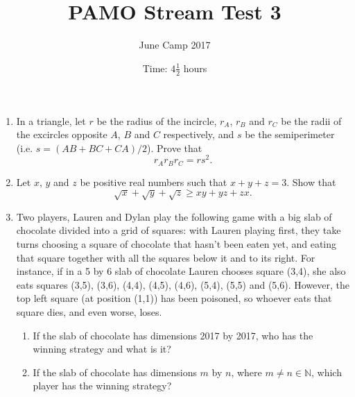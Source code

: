 \documentclass{article}
\title{PAMO Stream Test 3}
\author{June Camp 2017}
\date{Time: $4\frac{1}{2}$ hours}
\begin{document}
 \maketitle

\begin{enumerate}

\item %
	In a triangle, let $r$ be the radius of the incircle, $r_A$, $r_B$ and $r_C$ be the radii of the excircles opposite $A$, $B$ and $C$ respectively, and $s$ be the semiperimeter (i.e. $s = (AB+BC+CA)/2$). Prove that \[r_A r_B r_C = rs^2.\]

\item %
	Let $x$, $y$ and $z$ be positive real numbers such that $x+y+z = 3$. Show that \[\sqrt{x}+\sqrt{y}+\sqrt{z} \geq xy +yz +zx.\]

\item %
	Two players, Lauren and Dylan play the following game with a big slab of chocolate divided into a grid of squares: with Lauren playing first, they take turns choosing a square of chocolate that hasn't been eaten yet, and eating that square together with all the squares below it and to its right. For instance, if in a 5 by 6 slab of chocolate Lauren chooses square (3,4), she also eats squares (3,5), (3,6), (4,4), (4,5), (4,6), (5,4), (5,5) and (5,6). However, the top left square (at position (1,1)) has been poisoned, so whoever eats that square dies, and even worse, loses.
	\begin{enumerate}
		\item If the slab of chocolate has dimensions 2017 by 2017, who has the winning strategy and what is it?
		\item If the slab of chocolate has dimensions $m$ by $n$, where $m\neq n \in \mathbb{N}$, which player has the winning strategy?
	\end{enumerate}

\end{enumerate}
\end{document}
